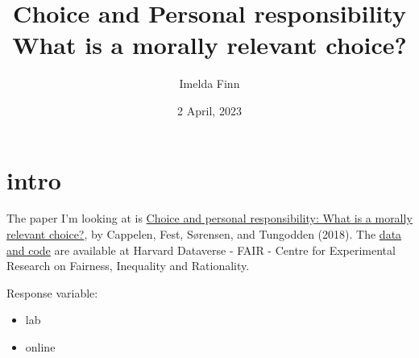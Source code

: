 \documentclass[12pt,letterpaper]{article}
\title{Choice and Personal responsibility\\What is a morally relevant choice?}
\date{2 April, 2023}
\author{Imelda Finn}
\begin{document}
	\maketitle
	\section*{intro}


\noindent  The paper I'm looking at is \href{https://cee.boun.edu.tr/sites/cee.boun.edu.tr/files/documents/CEE2018Conference/cprwmrc.pdf}{Choice and personal responsibility: What is a morally relevant choice?}, by Cappelen, Fest, Sørensen, and Tungodden (2018).
The \href{https://dataverse.harvard.edu/dataset.xhtml?persistentId=doi:10.7910/DVN/A6KFNO}{data and code} are available at Harvard Dataverse - FAIR - Centre for Experimental Research on Fairness, Inequality and Rationality.  %



	Response variable: 
	\begin{itemize}
	\item lab
	\item online
	\end{itemize}

\newpage

\begin{comment}
\tikzset{
  treenode/.style = {shape=rectangle, rounded corners,
                     draw, align=center,
                     top color=white, bottom color=blue!20},
  root/.style     = {treenode, font=\Large, bottom color=red!30},
  env/.style      = {treenode, font=\ttfamily\normalsize},
  dummy/.style    = {circle,draw}
}

\end{comment}
      

\end{document}
